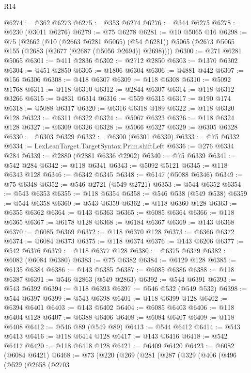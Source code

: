 \begin{lexlean}{R14}
\begin{coremodule}
@6274 := @362 @6273
@6275 := @353 @6274
@6276 := @344 @6275
@6278 := @6230 (@3011 @6276)
@6279 := @75 @6278
@6281 := @10 @5065 @16
@6298 := @75
    (@2662
      (@10 (@2663 @6281 @5065) (@54 @6281))
      @5065
      (@2673 @5065 @155 (@2683 (@2677 (@2687 (@5056 @2694)) @2698))))
@6300 := @271 @6281 @5065
@6301 := @411 @2836
@6302 := @2712 @2850
@6303 := @1370 @6302
@6304 := @451 @2850
@6305 := @1806 @6304
@6306 := @4881 @442
@6307 := @156 @6306
@6308 := @418 @6307
@6309 := @118 @6308
@6310 := @5092 @1768
@6311 := @118 @6310
@6312 := @2844 @6307
@6314 := @118 @6312 @3266
@6315 := @4831 @6314
@6316 := @559 @6315
@6317 := @190 @174
@6318 := @5088 @6317
@6320 := @6316 @6318 @189
@6322 := @118 @6320 @128
@6323 := @6311 @6322
@6324 := @5067 @6323
@6326 := @118 @6324 @128
@6327 := @6309 @6326
@6328 := @5066 @6327
@6329 := @6305 @6328
@6330 := @6303 @6329
@6332 := @6300 (@6301 @6330)
@6333 := @75 @6332
@6334 := LexLeanTarget.TargetSyntax.Prim.shiftLeft
@6336 := @276 @6334 @284
@6339 := @2880 (@2881 @6336 @2902)
@6340 := @75 @6339
@6341 := @542 @284
@6342 := @118 @6341
@6343 := @5092 @5121
@6345 := @118 @6343 @128
@6346 := @6342 @6345
@6348 := @6147 (@5088 @6346)
@6349 := @75 @6348
@6352 := @546 @2721 (@549 @2721)
@6353 := @544 @6352
@6354 := @543 @6353
@6355 := @118 @6354
@6358 := @546 @538 (@549 @538)
@6359 := @544 @6358
@6360 := @543 @6359
@6362 := @118 @6360 @128
@6363 := @6355 @6362
@6364 := @143 @6363
@6365 := @6085 @6364
@6366 := @118 @6365
@6367 := @6178 @128
@6368 := @6184 @6367
@6369 := @143 @6368
@6370 := @6085 @6369
@6372 := @118 @6370 @128
@6373 := @6366 @6372
@6374 := @6084 @6373
@6375 := @118 @6374
@6376 := @143 @6206
@6377 := @542 @6376
@6379 := @118 @6377 @128
@6380 := @6375 @6379
@6382 := @6082 (@6084 @6380)
@6383 := @75 @6382
@6384 := @6129 @128
@6385 := @6135 @6384
@6386 := @143 @6385
@6387 := @6085 @6386
@6388 := @118 @6387
@6391 := @546 @2863 (@549 @2863)
@6392 := @544 @6391
@6393 := @543 @6392
@6394 := @118 @6393
@6397 := @546 @532 (@549 @532)
@6398 := @544 @6397
@6399 := @543 @6398
@6401 := @118 @6399 @128
@6402 := @6394 @6401
@6403 := @143 @6402
@6404 := @6085 @6403
@6406 := @118 @6404 @128
@6407 := @6388 @6406
@6408 := @6084 @6407
@6409 := @118 @6408
@6412 := @546 @89 (@549 @89)
@6413 := @544 @6412
@6414 := @543 @6413
@6416 := @118 @6414 @128
@6417 := @143 @6416
@6418 := @542 @6417
@6420 := @118 @6418 @128
@6421 := @6409 @6420
@6423 := @6082 (@6084 @6421)
@6468 := @73
    (@220
      (@269
        (@281
          (@287
            (@329
              (@406
                (@496
                  (@529
                    (@2658
                      (@2703

\end{coremodule}
\end{lexlean}
